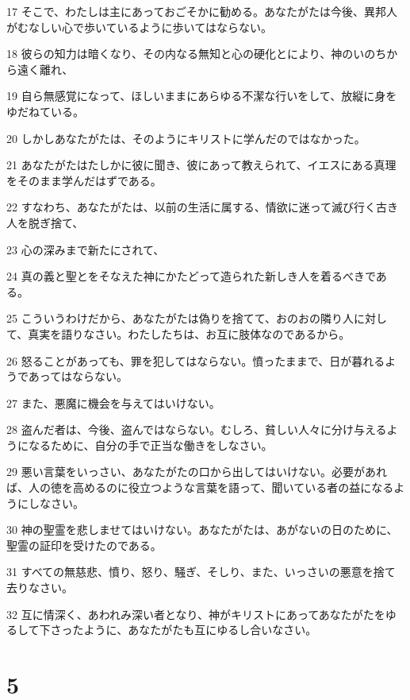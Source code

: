 \par 17 そこで、わたしは主にあっておごそかに勧める。あなたがたは今後、異邦人がむなしい心で歩いているように歩いてはならない。
\par 18 彼らの知力は暗くなり、その内なる無知と心の硬化とにより、神のいのちから遠く離れ、
\par 19 自ら無感覚になって、ほしいままにあらゆる不潔な行いをして、放縦に身をゆだねている。
\par 20 しかしあなたがたは、そのようにキリストに学んだのではなかった。
\par 21 あなたがたはたしかに彼に聞き、彼にあって教えられて、イエスにある真理をそのまま学んだはずである。
\par 22 すなわち、あなたがたは、以前の生活に属する、情欲に迷って滅び行く古き人を脱ぎ捨て、
\par 23 心の深みまで新たにされて、
\par 24 真の義と聖とをそなえた神にかたどって造られた新しき人を着るべきである。
\par 25 こういうわけだから、あなたがたは偽りを捨てて、おのおの隣り人に対して、真実を語りなさい。わたしたちは、お互に肢体なのであるから。
\par 26 怒ることがあっても、罪を犯してはならない。憤ったままで、日が暮れるようであってはならない。
\par 27 また、悪魔に機会を与えてはいけない。
\par 28 盗んだ者は、今後、盗んではならない。むしろ、貧しい人々に分け与えるようになるために、自分の手で正当な働きをしなさい。
\par 29 悪い言葉をいっさい、あなたがたの口から出してはいけない。必要があれば、人の徳を高めるのに役立つような言葉を語って、聞いている者の益になるようにしなさい。
\par 30 神の聖霊を悲しませてはいけない。あなたがたは、あがないの日のために、聖霊の証印を受けたのである。
\par 31 すべての無慈悲、憤り、怒り、騒ぎ、そしり、また、いっさいの悪意を捨て去りなさい。
\par 32 互に情深く、あわれみ深い者となり、神がキリストにあってあなたがたをゆるして下さったように、あなたがたも互にゆるし合いなさい。

\chapter{5}

